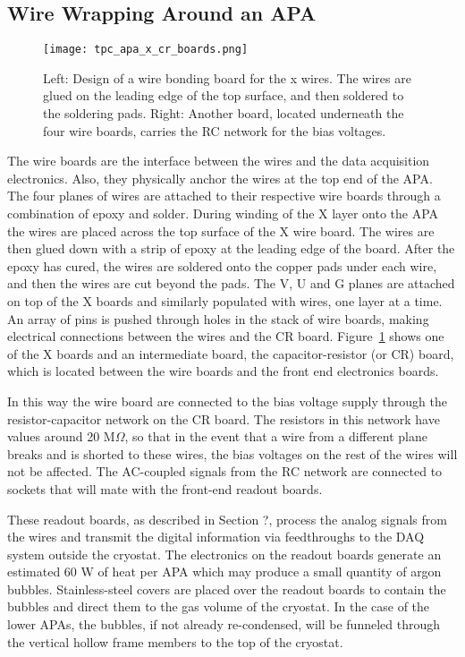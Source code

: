\subsection{Wire Wrapping Around an APA}


\begin{figure}[htpb]
\centering
\texttt{[image: tpc\_apa\_x\_cr\_boards.png]}
\caption[Conceptual design of a wire bonding board for the x wires]{Left: Design of a wire bonding board for the x wires.  The wires are glued on the leading edge of the top surface, and then soldered to the soldering pads. Right: Another board, located underneath the four wire boards, carries the RC network for the bias voltages. }
\label{fig:tpc-wire-board-x}
\end{figure}



The wire boards are the interface between the wires and the data acquisition electronics.  Also, they physically anchor the wires at the top end of the APA.  The four planes of wires are attached to their respective wire boards through a combination of epoxy and solder. During winding of the X layer onto the APA the wires are placed across the top surface of the X wire board. The wires are then glued down with a strip of epoxy at the leading edge of the board.  After the epoxy has cured, the wires are soldered onto the copper pads under each wire, and then the wires are cut beyond the pads. The V, U and G planes are attached on top of the X boards and similarly populated with wires, one layer at a time. An array of pins is pushed through holes in the stack of wire boards, making electrical connections between the wires and the CR board.   
Figure~\ref{fig:tpc-wire-board-x} shows one of the X boards and an intermediate board, the capacitor-resistor (or CR) board, which is located between the wire boards and the front end electronics boards.  

In this way the wire board are connected to the bias voltage supply through the resistor-capacitor network on the CR board. The resistors in this network have values around 20 M$\Omega$, so that in the event that a wire from a different plane breaks and is shorted to these wires, the bias voltages on the rest of the wires will not be affected. The AC-coupled signals from the RC network are connected to sockets that will mate with the front-end readout boards.

These readout boards, as described in Section ?, process the analog signals from the wires and transmit the digital information via feedthroughs to the DAQ system outside the cryostat. The electronics on the readout boards generate an estimated 60 W of heat per APA which may produce a small quantity of argon bubbles.  Stainless-steel covers are placed over the readout boards to contain the bubbles and direct them to the gas volume of the cryostat. In the case of the lower APAs, the bubbles, if not already re-condensed, will be funneled through the vertical hollow frame members to the top of the cryostat.


